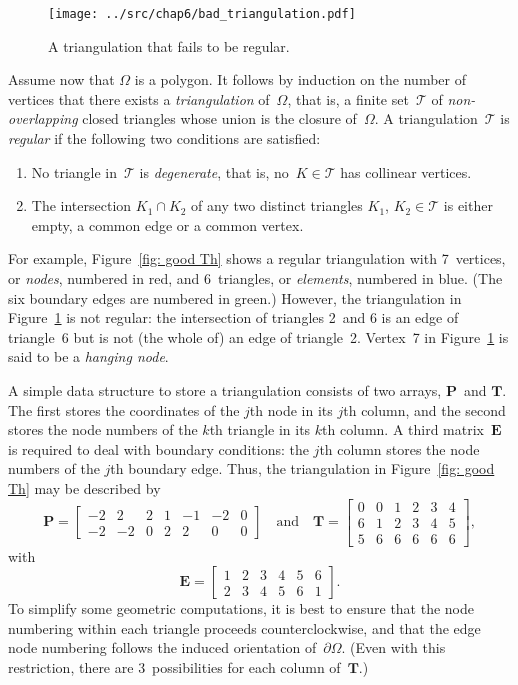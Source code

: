 \begin{figure}
\caption{A triangulation that fails to be regular.}\label{fig: bad Th}
\begin{center}
\texttt{[image: ../src/chap6/bad\_triangulation.pdf]} 
\end{center}
\end{figure}

Assume now that $\Omega$ is a polygon.  It follows by induction on the number 
of vertices that there exists a \emph{triangulation} of~$\Omega$, that is, a 
finite set~$\mathcal{T}$ of \emph{non-overlapping} closed triangles whose 
union is the closure of~$\Omega$. A triangulation~$\mathcal{T}$ is 
\emph{regular} if the following two conditions are satisfied:
\begin{enumerate}
\item No triangle in~$\mathcal{T}$ is \emph{degenerate}, that is, 
no~$K\in\mathcal{T}$ has collinear vertices.
\item The intersection $K_1\cap K_2$ of any two distinct triangles $K_1$, 
$K_2\in\mathcal{T}$ is either empty, a common edge or a common vertex.
\end{enumerate}
For example, Figure~\ref{fig: good Th} shows a regular triangulation with 
7~vertices, or \emph{nodes}, numbered in red, and 6~triangles, or 
\emph{elements}, numbered in blue.  (The six boundary edges are 
numbered in green.) However, the triangulation in 
Figure~\ref{fig: bad Th} is not regular: the intersection of triangles 2~and 6 
is an edge of triangle~6 but is not (the whole of) an edge of triangle~2.
Vertex~7 in Figure~\ref{fig: bad Th} is said to be a \emph{hanging node}.

A simple data structure to store a triangulation consists of two arrays,
$\boldsymbol{P}$~and $\boldsymbol{T}$.  The first stores the coordinates of the 
$j$th node in its $j$th column, and the second stores the node numbers of the
$k$th triangle in its $k$th column. A third matrix~$\boldsymbol{E}$ is required 
to deal with boundary conditions: the $j$th column stores the node numbers of 
the $j$th boundary edge.  Thus, the triangulation in 
Figure~\ref{fig: good Th} may be described by
\[
\boldsymbol{P}=\begin{bmatrix}
-2& 2& 2& 1&-1&-2& 0\\                
-2&-2& 0& 2& 2& 0& 0
\end{bmatrix}
\quad\text{and}\quad
\boldsymbol{T}=\begin{bmatrix}
0&0&1&2&3&4\\
6&1&2&3&4&5\\
5&6&6&6&6&6\end{bmatrix},
\]
with
\[
\boldsymbol{E}=\begin{bmatrix}
1&2&3&4&5&6\\
2&3&4&5&6&1\end{bmatrix}.
\]
To simplify some geometric computations, it is best to ensure that the node
numbering within each triangle proceeds counterclockwise, and that the edge
node numbering follows the induced orientation of~$\partial\Omega$. (Even with 
this restriction, there are $3$~possibilities for each column 
of~$\boldsymbol{T}$.)

